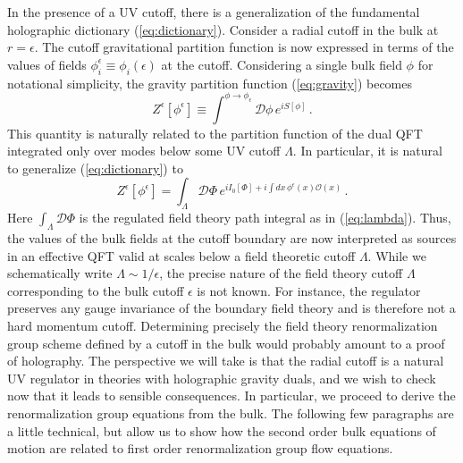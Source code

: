 \documentclass[10pt, oneside]{book}
\def\be{\begin{equation}}
\def\ee{\end{equation}}
\def\ocal{{\mathcal{O}}}
\begin{document}
\begin{doublespace}
In the presence of a UV cutoff, there is a generalization of the fundamental holographic dictionary (\ref{eq:dictionary}). Consider a radial cutoff in the bulk at $r=\epsilon$. The cutoff gravitational partition function is now expressed in terms of the values of fields $\phi_i^\epsilon \equiv \phi_i(\epsilon)$ at the cutoff. Considering a single bulk field $\phi$ for notational simplicity, the gravity partition function (\ref{eq:gravity}) becomes
\be\label{eq:gravityep}
Z^\epsilon[\phi^\epsilon] \equiv \int^{\phi \to \phi_\epsilon} {\mathcal D}\phi \, e^{i S[\phi]} \,.
\ee
This quantity is naturally related to the partition function of the dual QFT integrated only over modes below some UV cutoff $\Lambda$. In particular, it is natural to generalize (\ref{eq:dictionary}) to
\be\label{eq:dic}
Z^\epsilon[\phi^\epsilon] = \int_\Lambda {\mathcal D}\Phi \, e^{i I_0[\Phi] + i \int dx \, \phi^\epsilon(x) \ocal(x)} \,.
\ee
Here $\int_\Lambda {\mathcal D}\Phi$ is the regulated field theory path integral as in (\ref{eq:lambda}).
Thus, the values of the bulk fields at the cutoff boundary are now interpreted as sources in an effective QFT valid at scales below a field theoretic cutoff $\Lambda$. While we schematically write $\Lambda \sim 1/\epsilon$, the precise nature of the field theory cutoff $\Lambda$ corresponding to the bulk cutoff $\epsilon$ is not known. For instance, the regulator preserves any gauge invariance of the boundary field theory and is therefore not a hard momentum cutoff. Determining precisely the field theory renormalization group scheme defined by a cutoff in the bulk would probably amount to a proof of holography. The perspective we will take is that the radial cutoff is a natural UV regulator in theories with holographic gravity duals, and we wish to check now that it leads to sensible consequences. In particular, we proceed to derive the renormalization group equations from the bulk. The following few paragraphs are a little technical, but allow us to show how the second order bulk equations of motion are related to first order renormalization group flow equations.


\end{doublespace}
\end{document}
